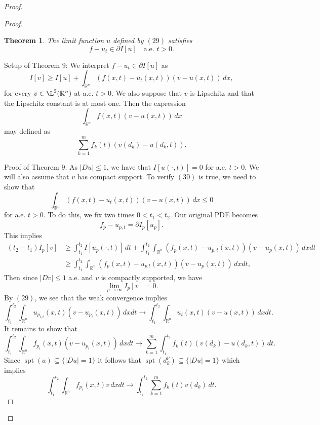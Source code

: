 \documentclass{article}
\newtheorem{theorem}{Theorem}
\begin{document}
\begin{flushleft}
\begin{proof}
\begin{proof}
\begin{theorem}
The limit function $u$ defined by $(29)$ satisfies $$f-u_t \in \partial I[u] \quad \text{a.e. $t>0$.}$$
\end{theorem}
Setup of Theorem $9$: We interpret $f-u_t \in \partial I[u] $ as
\begin{equation}I[v] \geq I[u] + \int_{\mathbb R^n} (f(x,t) - u_t(x,t))(v-u(x,t))\,dx,\end{equation}
for every $v\in \L^2(\mathbb R^n)$ at a.e. $t>0$. We also suppose that $v$ is Lipschitz and that the Lipschitz constant is at most one. Then the expression 
$$\int_{\mathbb R^n} f(x,t)(v - u(x,t))\,dx$$
may defined as
$$\sum_{k=1}^m f_k(t)(v(d_k)-u(d_k,t)).$$

Proof of Theorem $9$: As $|Du|\leq 1$, we have that $I\left[u(\cdot,t)\right]=0$ for a.e. $t>0$. We will also assume that $v$ has compact support. To verify $(30)$ is true, we need to show that
\begin{equation}
\int_{\mathbb R^n} (f(x,t) - u_t(x,t))(v-u(x,t))\,dx \leq 0
\end{equation}
for a.e. $t>0$. To do this, we fix two times $0 < t_1 < t_2$. Our original PDE becomes
$$f_p-u_{p,t} = \partial I_p[u_p].$$
This implies
\begin{align}
(t_2-t_1)I_p[v] &\geq \int_{t_1}^{t_2} I\left[u_p(\cdot,t)\right]\,dt + \int_{t_1}^{t_2} \int_{\mathbb R^n} (f_p(x,t) - u_{p,t}(x,t))(v-u_p(x,t))\,dxdt \nonumber\\& \geq
\int_{t_1}^{t_2} \int_{\mathbb R^n} (f_p(x,t) - u_{p.t}(x,t))(v-u_p(x,t))\,dxdt, 
\end{align}
Then since $|Dv|\leq 1$ a.e. and $v$ is compactly supported, we have
$$\lim_{p\to\infty}I_p[v]=0.$$
By $(29)$, we see that the weak convergence implies
\begin{equation}\int_{t_1}^{t_2} \int_{\mathbb R^n} u_{p_{i,t}}(x,t) (v - u_{p_i}(x,t))\,dxdt \to \int_{t_1}^{t_2} \int_{\mathbb R^n} u_t(x,t)(v-u(x,t))\,dxdt.
\end{equation}
It remains to show that
\begin{equation}
\int_{t_1}^{t_2}\int_{\mathbb R^n} f_{p_i}(x,t)(v - u_{p_i}(x,t))\,dxdt \to \sum_{k=1}^m \int_{t_1}^{t_2} f_k(t)(v(d_k)-u(d_k,t))\,dt.
\end{equation}
Since $\operatorname{spt}(a)\subseteq \{|Du|=1\}$ it follows that $\operatorname{spt}(d_k^p)\subseteq \{|Du|=1\}$ which implies
\begin{equation}\int_{t_1}^{t_2}\int_{\mathbb R^n} f_{p_i}(x,t)v\,dxdt\to \int_{t_1}^{t_2} \sum_{k=1}^m f_k(t) v(d_k)\,dt.

\end{equation}
\end{proof}
\end{proof}
\end{flushleft}
\end{document}
